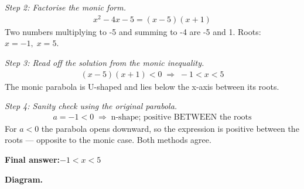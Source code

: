 \documentclass[11pt]{article}
\begin{document}
\textit{Step 2: Factorise the monic form.}
\[\begin{gathered}
x^2 - 4x - 5 = (x - 5)(x + 1)
\end{gathered}\]
Two numbers multiplying to -5 and summing to -4 are -5 and 1. Roots: \( x = -1, \; x = 5 \).

\textit{Step 3: Read off the solution from the monic inequality.}
\[\begin{gathered}
(x - 5)(x + 1) < 0 \;\Longrightarrow\; -1 < x < 5
\end{gathered}\]
The monic parabola is U-shaped and lies below the x-axis between its roots.

\textit{Step 4: Sanity check using the original parabola.}
\[\begin{gathered}
a = -1 < 0 \;\Longrightarrow\; \text{n-shape; positive BETWEEN the roots}
\end{gathered}\]
For \( a < 0 \) the parabola opens downward, so the expression is positive between the roots --- opposite to the monic case. Both methods agree.

\begin{answerbox}
\textbf{Final answer:}\quad \(\displaystyle -1 < x < 5\)
\end{answerbox}
\textbf{Diagram.}
\end{document}
